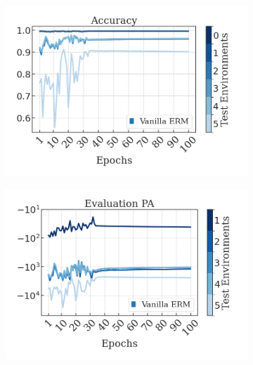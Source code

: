 \begin{figure}[H]
    \centering
    \begin{subfigure}[b]{0.45\textwidth}
        \centering
        \includegraphics[width=\textwidth]{img/results_discussion/datashift/paper_oracle_all_erm.png}
    \end{subfigure}
    \hfill
    \begin{subfigure}[b]{0.45\textwidth}
        \centering
        \includegraphics[width=\textwidth]{img/results_discussion/datashift/paper_PA_all_erm.png}
    \end{subfigure}

    \vspace{1em}


\end{figure}
